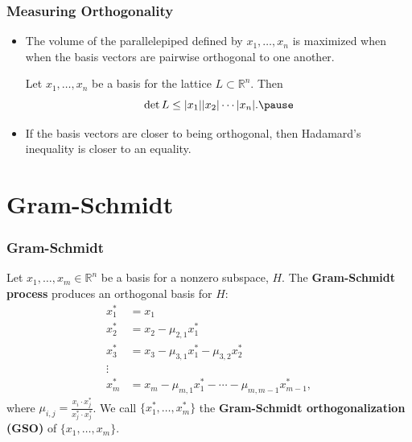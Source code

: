\documentclass{beamer}
\newcommand{\reals}{\mathbb{R}}
\begin{document}
\begin{frame}
	\frametitle{Measuring Orthogonality}
	\begin{itemize}
		\item The volume of the parallelepiped defined by $x_1, \ldots, x_n$ is maximized when when the basis vectors are pairwise orthogonal to one another.\pause
		\begin{theorem}
			Let $x_1, \ldots, x_n$ be a basis for the lattice $L\subset \reals^n$. Then
			\[
			\det L\leq |x_1||x_2|\cdots |x_n|.\pause
			\]
		\end{theorem}
		\item If the basis vectors are closer to being orthogonal, then Hadamard's inequality is closer to an equality.
	\end{itemize}
\end{frame}

\section{Gram-Schmidt}
\begin{frame}
	\frametitle{Gram-Schmidt}
		\begin{definition}
			Let $x_1, \ldots, x_m \in \reals^n$ be a basis for a nonzero subspace, $H$. The \textbf{Gram-Schmidt process} produces an orthogonal basis for $H$:
			\begin{align*}
				x_1^* &= x_1\\
				x_2^* &= x_2 - \mu_{2, 1}x_1^*\\
				x_3^* &= x_3 - \mu_{3,1}x_1^* - \mu_{3,2}x_2^*\\
				\vdots\\
				x_m^* &= x_m - \mu_{m,1}x_1^* - \cdots - \mu_{m, m-1}x_{m-1}^*,
			\end{align*}
			where $\mu_{i,j} = \frac{x_i\cdot x_j^*}{x_j^*\cdot x_j^*}$. We call $\{x_1^*, \ldots, x_m^*\}$ the \textbf{Gram-Schmidt orthogonalization (GSO)} of $\{x_1, \ldots, x_m\}$.
		\end{definition}
\end{frame}
\end{document}
